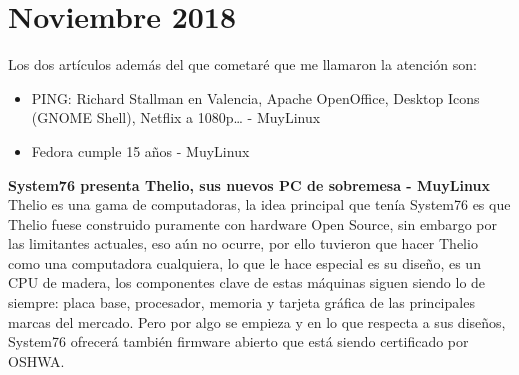 \documentclass[a4paper, 11pt, oneside]{article}
\begin{document}
\section*{Noviembre 2018}
Los dos artículos además del que cometaré que me llamaron la atención son:
\begin{itemize}
    \item PING: Richard Stallman en Valencia, Apache OpenOffice, Desktop Icons (GNOME Shell), Netflix a 1080p… - MuyLinux
    \item Fedora cumple 15 años - MuyLinux
\end{itemize}
\textbf{System76 presenta Thelio, sus nuevos PC de sobremesa - MuyLinux}
Thelio es una gama de computadoras, la idea principal que tenía System76 es que Thelio fuese construido puramente con hardware Open Source, sin embargo por las limitantes actuales, eso aún no ocurre, por ello tuvieron que hacer Thelio como una computadora cualquiera, lo que le hace especial es su diseño, es un CPU de madera, los componentes clave de estas máquinas siguen siendo lo de siempre: placa base, procesador, memoria y tarjeta gráfica de las principales marcas del mercado. Pero por algo se empieza y en lo que respecta a sus diseños, System76 ofrecerá también firmware abierto que está siendo certificado por OSHWA.
\end{document}
